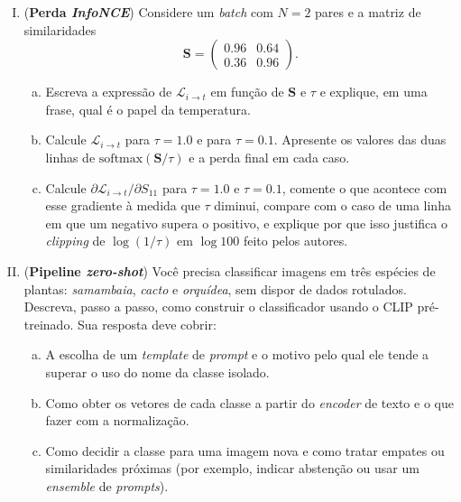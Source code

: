 \documentclass{dlproblemset}
\begin{document}
\begin{enumerate}[I)]

    \item {} (\textbf{Perda \textit{InfoNCE}}) Considere um \textit{batch} com $N = 2$ pares e a matriz de similaridades
    \[
        \mathbf{S} = \begin{pmatrix} 0.96 & 0.64 \\ 0.36 & 0.96 \end{pmatrix}.
    \]
    \begin{enumerate}[(a)]
        \item Escreva a expressão de $\mathcal{L}_{i \to t}$ em função de $\mathbf{S}$ e $\tau$ e explique, em uma frase, qual é o papel da temperatura.
        \item Calcule $\mathcal{L}_{i \to t}$ para $\tau = 1.0$ e para $\tau = 0.1$. Apresente os valores das duas linhas de $\mathrm{softmax}(\mathbf{S}/\tau)$ e a perda final em cada caso.
        \item Calcule $\partial \mathcal{L}_{i \to t}/\partial S_{11}$ para $\tau = 1.0$ e $\tau = 0.1$, comente o que acontece com esse gradiente à medida que $\tau$ diminui, compare com o caso de uma linha em que um negativo supera o positivo, e explique por que isso justifica o \textit{clipping} de $\log(1/\tau)$ em $\log 100$ feito pelos autores.
    \end{enumerate}

    \item (\textbf{Pipeline \textit{zero-shot}}) Você precisa classificar imagens em três espécies de plantas: \textit{samambaia}, \textit{cacto} e \textit{orquídea}, sem dispor de dados rotulados. Descreva, passo a passo, como construir o classificador usando o CLIP pré-treinado. Sua resposta deve cobrir:
    \begin{enumerate}[(a)]
        \item A escolha de um \textit{template} de \textit{prompt} e o motivo pelo qual ele tende a superar o uso do nome da classe isolado.
        \item Como obter os vetores de cada classe a partir do \textit{encoder} de texto e o que fazer com a normalização.
        \item Como decidir a classe para uma imagem nova e como tratar empates ou similaridades próximas (por exemplo, indicar abstenção ou usar um \textit{ensemble} de \textit{prompts}).
    \end{enumerate}


\end{enumerate}
\end{document}
